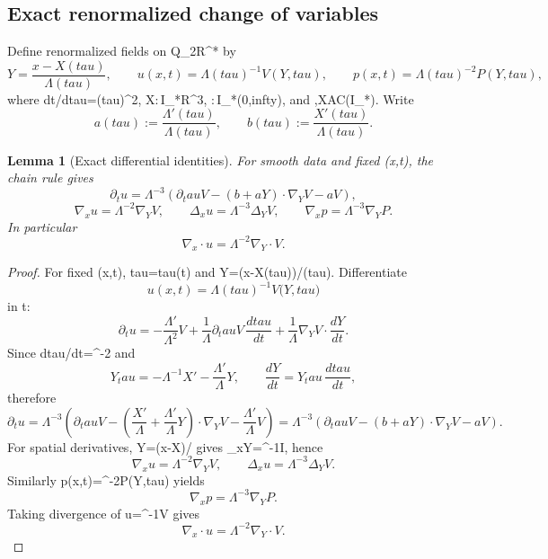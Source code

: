 \documentclass[11pt]{amsart}
\def\({}%
\def\){}%
\def\mathbb#1{#1}%
\def\tau{tau}%
\def\infty{infty}%
\theoremstyle{plain}
\newtheorem{lemma}[lemma]{Lemma}
\theoremstyle{definition}
\theoremstyle{remark}
\newcommand{\RR}{\mathbb R}
\newcommand{\nn}{\nabla}
\begin{document}
\subsection{Exact renormalized change of variables}\label{paper2:sec:change}

Define renormalized fields on \(Q_{2R}^*\) by
\[
Y=\frac{x-X(\tau)}{\Lambda(\tau)},\qquad
u(x,t)=\Lambda(\tau)^{-1}V(Y,\tau),\qquad
p(x,t)=\Lambda(\tau)^{-2}P(Y,\tau),
\]
where \(dt/d\tau=\Lambda(\tau)^2\), \(X:\,I_*\to\RR^3\), \(\Lambda:\,I_*\to(0,\infty)\),
and \(\Lambda,X\in AC(I_*)\).
Write
\[
a(\tau):=\frac{\Lambda'(\tau)}{\Lambda(\tau)},\qquad
b(\tau):=\frac{X'(\tau)}{\Lambda(\tau)}.
\]

\begin{lemma}[Exact differential identities]\label{paper2:lem:change-id}
For smooth data and fixed \((x,t)\), the chain rule gives
\[
\partial_t u
=\Lambda^{-3}\left(\partial_\tau V-(b+aY)\cdot\nabla_Y V-aV\right),
\]
\[
\nn_x u=\Lambda^{-2}\nn_Y V,\qquad \Delta_x u=\Lambda^{-3}\Delta_Y V,\qquad
\nn_x p=\Lambda^{-3}\nn_Y P.
\]
In particular
\[
\nn_x\cdot u=\Lambda^{-2}\nn_Y\cdot V.
\]
\end{lemma}
\begin{proof}
For fixed \((x,t)\), \(\tau=\tau(t)\) and \(Y=(x-X(\tau))/\Lambda(\tau)\).
Differentiate
\[
u(x,t)=\Lambda(\tau)^{-1}V\bigl(Y,\tau\bigr)
\]
in \(t\):
\[
\partial_t u
=-\frac{\Lambda'}{\Lambda^2}V
+\frac1\Lambda\partial_\tau V\,\frac{d\tau}{dt}
+\frac1\Lambda\nabla_YV\cdot\frac{dY}{dt}.
\]
Since \(d\tau/dt=\Lambda^{-2}\) and
\[
Y_\tau=-\Lambda^{-1}X'-\frac{\Lambda'}{\Lambda}Y,\qquad
\frac{dY}{dt}=Y_\tau\,\frac{d\tau}{dt},
\]
therefore
\[
\partial_tu
=\Lambda^{-3}\left(\partial_\tau V-
\left(\frac{X'}{\Lambda}+\frac{\Lambda'}{\Lambda}Y\right)\cdot\nabla_YV
-\frac{\Lambda'}{\Lambda}V\right)
=\Lambda^{-3}\left(\partial_\tau V-(b+aY)\cdot\nabla_YV-aV\right).
\]
For spatial derivatives, \(Y=(x-X)/\Lambda\) gives \(\nabla_xY=\Lambda^{-1}I\), hence
\[
\nabla_xu=\Lambda^{-2}\nabla_YV,\qquad
\Delta_xu=\Lambda^{-3}\Delta_YV.
\]
Similarly \(p(x,t)=\Lambda^{-2}P(Y,\tau)\) yields
\[
\nabla_x p=\Lambda^{-3}\nabla_YP.
\]
Taking divergence of \(u=\Lambda^{-1}V\) gives
\[
\nabla_x\cdot u=\Lambda^{-2}\nabla_Y\cdot V.
\]
\end{proof}
\end{document}
